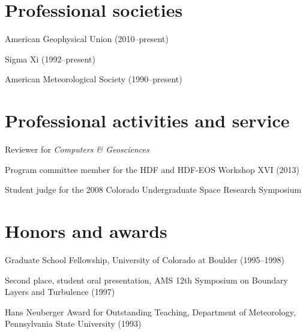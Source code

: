 \documentclass[letterpaper]{resume}
\begin{document}

\section{Professional societies}

\vspace{1.0em}
\begin{compactitem}[\itembullet]
  \item American Geophysical Union (2010--present) 
  \item Sigma Xi (1992--present)
  \item American Meteorological Society (1990--present)
\end{compactitem}


\section{Professional activities and service}

\vspace{1.0em}
\begin{compactitem}[\itembullet]
  \item Reviewer for \textit{Computers \& Geosciences}
  \item Program committee member for the HDF and HDF-EOS Workshop XVI (2013)
  \item Student judge for the 2008 Colorado Undergraduate Space
    Research Symposium
\end{compactitem}


\section{Honors and awards}

\vspace{1.0em}
\begin{compactitem}[\itembullet]
  \item Graduate School Fellowship, University of Colorado
    at Boulder (1995--1998)
  \item Second place, student oral presentation, AMS 12th
    Symposium on Boundary Layers and Turbulence (1997)
  \item Hans Neuberger Award for Outstanding Teaching,
    Department of Meteorology, Pennsylvania State University (1993)
\end{compactitem}
\end{document}

